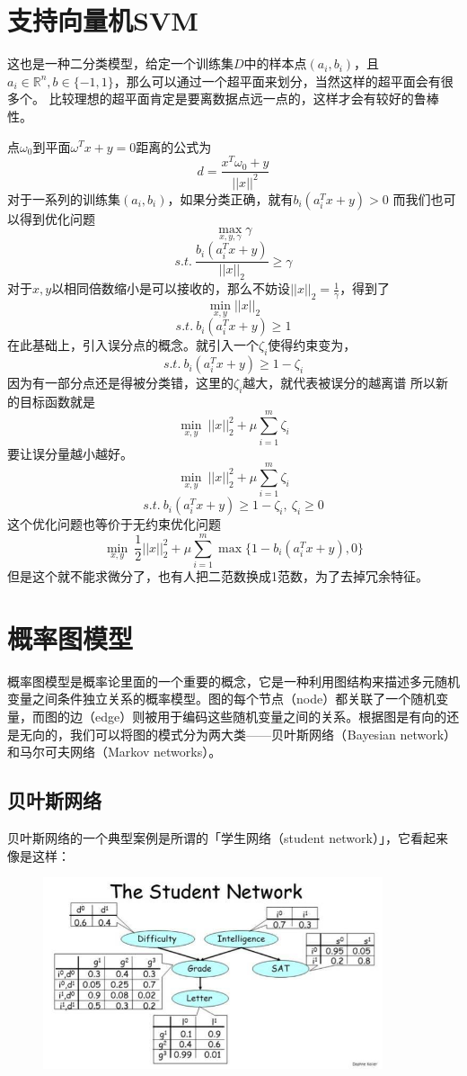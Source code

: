 \documentclass{article}
\begin{document}
\section{支持向量机SVM}
这也是一种二分类模型，给定一个训练集$D$中的样本点$(a_i,b_i)$，且$a_i \in \mathbb{R}^n,b \in \{-1,1\}$，那么可以通过一个超平面来划分，当然这样的超平面会有很多个。
比较理想的超平面肯定是要离数据点远一点的，这样才会有较好的鲁棒性。

点$\omega_0$到平面$\omega^Tx+y=0$距离的公式为$$
d=\frac{x^T\omega_0+y}{||x||^2}
$$
对于一系列的训练集$(a_i,b_i)$，如果分类正确，就有$b_i(a_i^Tx+y)>0$
而我们也可以得到优化问题
$$
\max\limits_{x,y,\gamma} \gamma
$$
$$
s.t. \ \frac{b_i(a_i^Tx+y)}{||x||_2} \ge \gamma 
$$
对于$x,y$以相同倍数缩小是可以接收的，那么不妨设$||x||_2=\frac{1}{\gamma}$，得到了
$$
\min\limits_{x,y}  ||x||_2
$$
$$
s.t. \ b_i(a_i^Tx+y) \ge 1
$$
在此基础上，引入误分点的概念。就引入一个$\zeta_i$使得约束变为，
$$
s.t. \ b_i(a_i^Tx+y) \ge 1-\zeta_i
$$
因为有一部分点还是得被分类错，这里的$\zeta_i$越大，就代表被误分的越离谱
所以新的目标函数就是
$$
\min\limits_{x,y} \  ||x||_2^2+\mu \sum\limits_{i=1}^m \zeta_i
$$
要让误分量越小越好。
$$
\min\limits_{x,y} \  ||x||_2^2+\mu \sum\limits_{i=1}^m \zeta_i
$$
$$
s.t. \ b_i(a_i^Tx+y) \ge 1-\zeta_i, \ \zeta_i \ge 0
$$
这个优化问题也等价于无约束优化问题
$$
\min\limits_{x,y} \ \frac{1}{2}||x||_2^2+\mu \sum\limits_{i=1}^m \max\{ 1-b_i(a_i^Tx+y),0\}
$$
但是这个就不能求微分了，也有人把二范数换成1范数，为了去掉冗余特征。

\section{概率图模型}
概率图模型是概率论里面的一个重要的概念，它是一种利用图结构来描述多元随机变量之间条件独立关系的概率模型。图的每个节点（node）都关联了一个随机变量，而图的边（edge）则被用于编码这些随机变量之间的关系。根据图是有向的还是无向的，我们可以将图的模式分为两大类——贝叶斯网络（ Bayesian network）和马尔可夫网络（Markov networks）。
\subsection{贝叶斯网络}
贝叶斯网络的一个典型案例是所谓的「学生网络（student network）」，它看起来像是这样：
\begin{figure}[h]
    \centering
    \includegraphics[width=10cm]{1.jpeg}
\end{figure}
\end{document}

